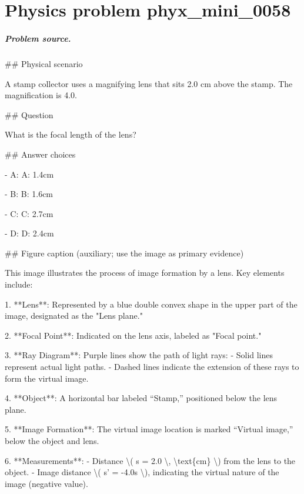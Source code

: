 
\chapter{Physics problem phyx\_mini\_0058}
\label{ch:PhyXMiniProblems_problem_phyx_mini_0058}

\paragraph{Problem source.}
\#\# Physical scenario

A stamp collector uses a magnifying lens that sits 2.0 cm above the stamp. The magnification is 4.0.

\#\# Question

What is the focal length of the lens?

\#\# Answer choices

- A: A: 1.4cm

- B: B: 1.6cm

- C: C: 2.7cm

- D: D: 2.4cm

\#\# Figure caption (auxiliary; use the image as primary evidence)

This image illustrates the process of image formation by a lens. Key elements include:

1. **Lens**: Represented by a blue double convex shape in the upper part of the image, designated as the "Lens plane."

2. **Focal Point**: Indicated on the lens axis, labeled as "Focal point."

3. **Ray Diagram**: Purple lines show the path of light rays:
   - Solid lines represent actual light paths.
   - Dashed lines indicate the extension of these rays to form the virtual image.

4. **Object**: A horizontal bar labeled “Stamp,” positioned below the lens plane.

5. **Image Formation**: The virtual image location is marked “Virtual image,” below the object and lens.

6. **Measurements**:
   - Distance \textbackslash{}( s = 2.0 \textbackslash{}, \textbackslash{}text\{cm\} \textbackslash{}) from the lens to the object.
   - Image distance \textbackslash{}( s' = -4.0s \textbackslash{}), indicating the virtual nature of the image (negative value).


